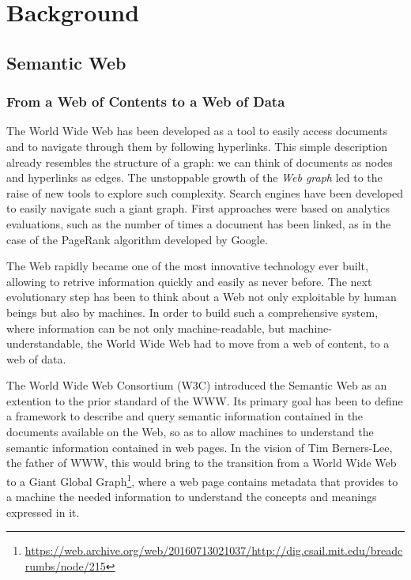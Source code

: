 \documentclass[%
    corpo=13.5pt,
    twoside,
    oldstyle,
    tipotesi=magistrale,
    greek,
    evenboxes
]{toptesi}
\begin{document}
\chapter{Background}

\section{Semantic Web}

\subsection{From a Web of Contents to a Web of Data}

The World Wide Web has been developed as a tool to easily access
documents and to navigate through them by following hyperlinks.
This simple description already resembles the structure of a graph: we can
think of documents as nodes and hyperlinks as edges. The unstoppable growth
of the \emph{Web graph} led to the raise of new tools to explore such
complexity. Search engines have been developed to easily navigate such a
giant graph. First approaches were based on analytics evaluations,
such as the number of times a document has been linked, as in the case of the
PageRank \cite{page1999} algorithm developed by Google.
\newline

The Web rapidly became one of the most innovative technology ever built,
allowing to retrive information quickly and easily as never before.
The next evolutionary step has been to think about a Web not only exploitable by
human beings but also by machines. In order to build such a comprehensive
system, where information can be not only machine-readable, but
machine-understandable, the World Wide Web had to move from a web of content, to
a web of data.
\newline

The World Wide Web Consortium (W3C) introduced the Semantic Web as an extention
to the prior standard of the WWW. Its primary goal has been
to define a framework to describe and query semantic information contained
in the documents available on the Web, so as to allow machines to understand
the semantic information contained in web pages. In the vision of Tim
Berners-Lee, the father of WWW, this would bring to the transition from a
World Wide Web to a Giant Global Graph\footnote{\url{https://web.archive.org/web/20160713021037/http://dig.csail.mit.edu/breadcrumbs/node/215}},
where a web page contains metadata that provides to a machine the needed
information to understand the concepts and meanings expressed in it.
\end{document}
